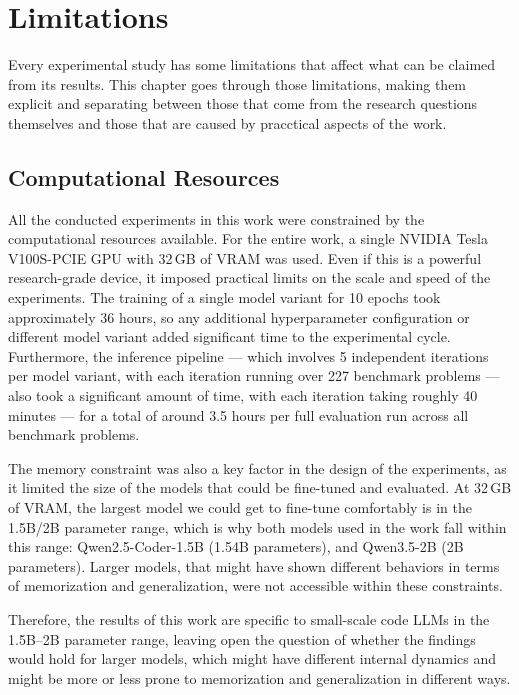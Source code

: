 \documentclass[mscthesis]{usiinfthesis}
\begin{document}
\chapter{Limitations}
Every experimental study has some limitations that affect what can be claimed from its results.
This chapter goes through those limitations, making them explicit and separating between those that come from the research questions themselves and those that are caused by pracctical aspects of the work.

\section{Computational Resources}
All the conducted experiments in this work were constrained by the computational resources available.
For the entire work, a single NVIDIA Tesla V100S-PCIE GPU with 32\,GB of VRAM was used.
Even if this is a powerful research-grade device, it imposed practical limits on the scale and speed of the experiments.
The training of a single model variant for 10 epochs took approximately 36 hours, so any additional hyperparameter configuration or different model variant added significant time to the experimental cycle.
Furthermore, the inference pipeline --- which involves 5 independent iterations per model variant, with each iteration running over 227 benchmark problems --- also took a significant amount of time, with each iteration taking roughly 40 minutes --- for a total of around 3.5 hours per full evaluation run across all benchmark problems.
\par\vspace{1em}
The memory constraint was also a key factor in the design of the experiments, as it limited the size of the models that could be fine-tuned and evaluated.
At 32\,GB of VRAM, the largest model we could get to fine-tune comfortably is in the 1.5B/2B parameter range, which is why both models used in the work fall within this range: Qwen2.5-Coder-1.5B (1.54B parameters), and Qwen3.5-2B (2B parameters).
Larger models, that might have shown different behaviors in terms of memorization and generalization, were not accessible within these constraints.
\par\vspace{1em}
Therefore, the results of this work are specific to small-scale code LLMs in the 1.5B--2B parameter range, leaving open the question of whether the findings would hold for larger models, which might have different internal dynamics and might be more or less prone to memorization and generalization in different ways.
\end{document}
